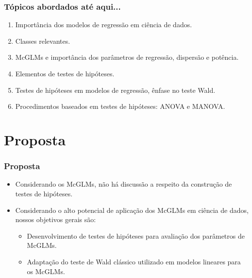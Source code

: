 \documentclass[10pt,
  aspectratio=169,
  serif,
  mathserif,
  professionalfont,
  compress,
  handout,
  ]{beamer}\usepackage[]{graphicx}\usepackage[]{color}
\begin{document}
\begin{frame}
  \frametitle{Tópicos abordados até aqui...}

\begin{enumerate}

  \itemsep 2ex
  
  \item Importância dos modelos de regressão em ciência de dados.
  
  \item Classes relevantes.
  
  \item McGLMs e importância dos parâmetros de regressão, dispersão e potência.
  
  \item Elementos de testes de hipóteses.
  
  \item Testes de hipóteses em modelos de regressão, ênfase no teste Wald.
  
  \item Procedimentos baseados em testes de hipóteses: ANOVA e MANOVA.
  
\end{enumerate}

\end{frame}


\section{Proposta}


\begin{frame}
  \frametitle{Proposta}

\begin{itemize}

  \itemsep 2ex
  
  \item Considerando os McGLMs, não há discussão a respeito da construção de testes de hipóteses.
  
  \item Considerando o alto potencial de aplicação dos McGLMs em ciência de dados, nossos objetivos gerais são:

  \begin{itemize}
  
  \itemsep 2ex
  
  \item Desenvolvimento de testes de hipóteses para avaliação dos parâmetros de McGLMs.

  \item Adaptação do teste de Wald clássico utilizado em modelos lineares para os McGLMs. 

  \end{itemize}
  
\end{itemize}

\end{frame}
\end{document}
